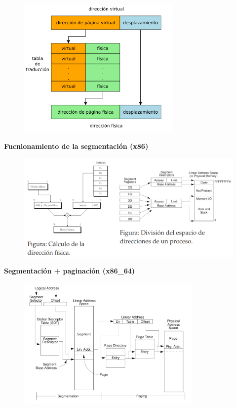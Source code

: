 \documentclass{article}
\begin{document}
\begin{figure}[h]
\centering
\includegraphics[scale=1,width=80mm]{traduccion.png}
\end{figure}
\newpage

\textbf{Fucnionamiento de la segmentación (x86)}
\begin{figure}[h]
\centering
\includegraphics[scale=1,width=\textwidth]{segmentacionx86.png}
\end{figure}
\newpage

\textbf{Segmentación + paginación (x86\_64)}
\begin{figure}[h]
\centering
\includegraphics[scale=1,width=90mm]{segmentacionpaginacion.png}
\end{figure}
\end{document}
